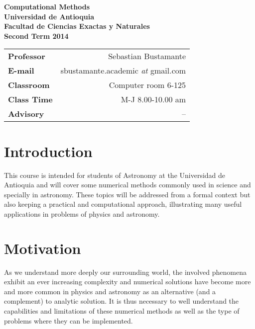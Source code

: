 \documentclass[a4,useAMS,usenatbib,usegraphicx,12pt]{article}
\begin{document}
\begin{flushleft}
  \sffamily\bfseries
  {\Large Computational Methods}\LOGO\\
  Universidad de Antioquia\\
  Facultad de Ciencias Exactas y Naturales\\
  Second Term 2014
\end{flushleft}

\hrulefill\par

\vspace{1cm}
\begin{tabular}{L!{\VRule}R}
\bf Professor		& Sebastian Bustamante\\
\bf E-mail			& sbustamante.academic \textit{at} gmail.com\\
\bf Classroom		& Computer room 6-125\\
\bf Class Time		& M-J 8.00-10.00 am \\
\bf Advisory		& --
\end{tabular}


\section*{Introduction}

This course is intended for students of Astronomy at the Universidad de Antioquia 
and will cover some numerical methods commonly used in science and specially in 
astronomy. These topics will be addressed from a formal context but also keeping 
a practical and computational approach, illustrating many useful applications in
problems of physics and astronomy.

\section*{Motivation}

As we understand more deeply our surrounding world, the involved phenomena
exhibit an ever increasing complexity and numerical solutions have become 
more and more common in physics and astronomy as an alternative (and a complement) 
to analytic solution. It is thus necessary to well understand the capabilities 
and limitations of these numerical methods as well as the type
of problems where they can be implemented.
\end{document}
